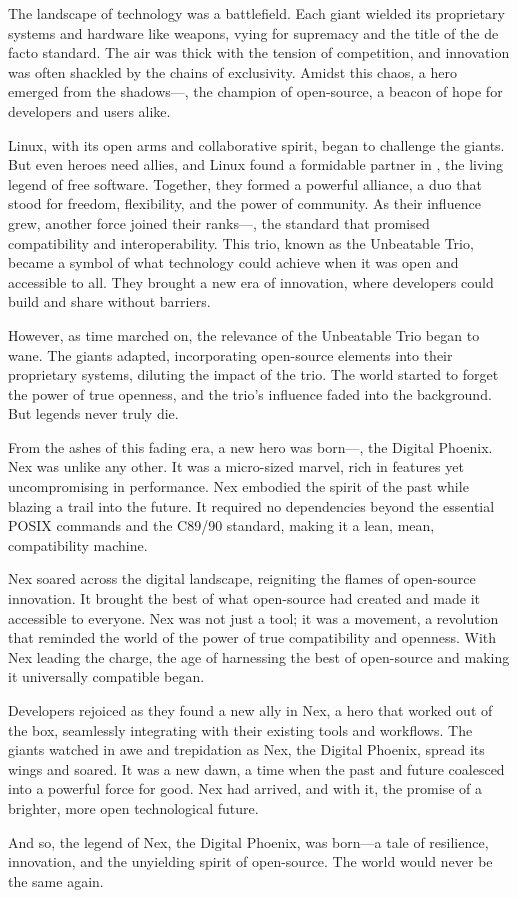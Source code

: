 The landscape of technology was a battlefield. 
Each giant wielded its proprietary systems and hardware like weapons, vying for supremacy and the title of the de facto standard.
The air was thick with the tension of competition, and innovation was often shackled by the chains of exclusivity.
Amidst this chaos, a hero emerged from the shadows—, the champion of open-source, a beacon of hope for developers and users alike.

Linux, with its open arms and collaborative spirit, began to challenge the giants.
But even heroes need allies, and Linux found a formidable partner in , the living legend of free software.
Together, they formed a powerful alliance, a duo that stood for freedom, flexibility, and the power of community.
As their influence grew, another force joined their ranks—, the standard that promised compatibility and interoperability.
This trio, known as the Unbeatable Trio, became a symbol of what technology could achieve when it was open and accessible to all.
They brought a new era of innovation, where developers could build and share without barriers.

However, as time marched on, the relevance of the Unbeatable Trio began to wane. The giants adapted, incorporating open-source elements into their proprietary systems, diluting the impact of the trio. The world started to forget the power of true openness, and the trio's influence faded into the background.
But legends never truly die.

From the ashes of this fading era, a new hero was born—, the Digital Phoenix. Nex was unlike any other. It was a micro-sized marvel, rich in features yet uncompromising in performance. Nex embodied the spirit of the past while blazing a trail into the future.
It required no dependencies beyond the essential POSIX commands and the C89/90 standard, making it a lean, mean, compatibility machine.

Nex soared across the digital landscape, reigniting the flames of open-source innovation.
It brought the best of what open-source had created and made it accessible to everyone.
Nex was not just a tool; it was a movement, a revolution that reminded the world of the power of true compatibility and openness.
With Nex leading the charge, the age of harnessing the best of open-source and making it universally compatible began.

Developers rejoiced as they found a new ally in Nex, a hero that worked out of the box, seamlessly integrating with their existing tools and workflows.
The giants watched in awe and trepidation as Nex, the Digital Phoenix, spread its wings and soared.
It was a new dawn, a time when the past and future coalesced into a powerful force for good.
Nex had arrived, and with it, the promise of a brighter, more open technological future.

And so, the legend of Nex, the Digital Phoenix, was born—a tale of resilience, innovation, and the unyielding spirit of open-source.
The world would never be the same again.